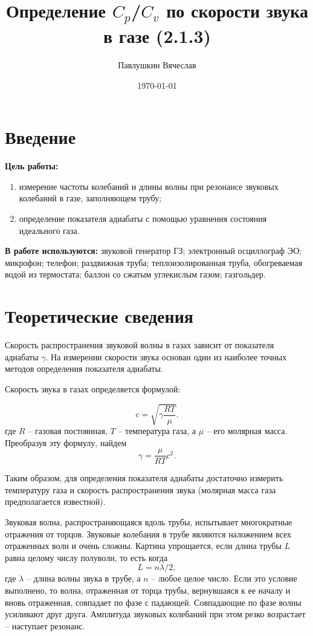 \documentclass[a4paper,12pt]{article}
\title{Определение $C_p$/$C_v$ по скорости звука в газе (2.1.3)}
\author{Павлушкин Вячеслав}
\date{\today}
\theoremstyle{definition}
\begin{document}
	\maketitle
	
	\section{Введение}
	\noindent\textbf{Цель работы:}  
	\begin{enumerate}
		\item измерение частоты колебаний и длины волны при резонансе звуковых колебаний в газе, заполняющем трубу;
		\item определение показателя адиабаты с помощью уравнения состояния идеального газа.
	\end{enumerate}
	
	\textbf{В работе используются:} звуковой генератор ГЗ; электронный осциллограф ЭО; микрофон; телефон; раздвижная труба; теплоизолированная труба, обогреваемая водой из термостата; баллон со сжатым углекислым газом; газгольдер.
	
	\section{Теоретические сведения}
	
	Скорость распространения звуковой волны в газах зависит от показателя адиабаты $\gamma $. На измерении скорости звука основан один из наиболее точных методов определения показателя адиабаты.
	
	Скорость звука в газах определяется формулой:
	
	\begin{equation}
		c=\sqrt{\gamma\frac{RT}{\mu}}.
		\label{velocity}
	\end{equation}
	где $ R $ -- газовая постоянная, $ T $ -- температура газа, а $ \mu $ -- его молярная масса. Преобразуя эту формулу, найдем
	\begin{equation}\label{gamma}
		\boxed{\gamma = \frac{\mu}{RT}c^2}.
	\end{equation}
	
	Таким образом, для определения показателя адиабаты достаточно измерить температуру газа и скорость распространения звука (молярная масса газа предполагается известной).
	
	Звуковая волна, распространяющаяся вдоль трубы, испытывает многократные отражения от торцов. Звуковые колебания в трубе являются наложением всех отраженных волн и очень сложны. Картина упрощается, если длина трубы $ L $ равна целому числу полуволн, то есть когда \[ L=n\lambda/2, \] где $ \lambda $ -- длина волны звука в трубе, а $ n $ -- любое целое число. Если это условие выполнено, то волна, отраженная от торца трубы, вернувшаяся к ее началу и вновь отраженная, совпадает по фазе с падающей. Совпадающие по фазе волны усиливают друг друга. Амплитуда звуковых колебаний при этом резко возрастает -- наступает резонанс.
	
\end{document}
